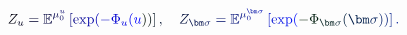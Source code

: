 \documentclass[12pt]{article}
\begin{document}
\makeatletter
\renewcommand*{\@textcolor}[3]{%
  \protect\leavevmode
  \begingroup
    \color#1{#2}#3%
  \endgroup
}
\makeatother
\begin{displaymath}
\mathcolor[RGB]{0,0,15}{Z} _ { \mathcolor[RGB]{0,0,30}{u} } \mathcolor[RGB]{0,0,45}{=} \mathbb { \mathcolor[RGB]{0,0,60}{E} } ^ { \mathcolor[RGB]{0,0,75}{\mu} _ { \mathcolor[RGB]{0,0,90}{0} } ^ { \mathcolor[RGB]{0,0,105}{u} } } \mathcolor[RGB]{0,0,120}{\left[} \mathrm { \mathcolor[RGB]{0,0,135}{e} \mathcolor[RGB]{0,0,150}{x} \mathcolor[RGB]{0,0,165}{p} } \mathcolor[RGB]{0,0,180}{(} \mathcolor[RGB]{0,0,195}{-} \mathcolor[RGB]{0,0,210}{\Phi} _ { \mathcolor[RGB]{0,0,225}{u} } \mathcolor[RGB]{0,0,240}{(} \mathcolor[RGB]{0,0,255}{u} \mathcolor[RGB]{0,15,0}{)} \mathcolor[RGB]{0,15,15}{)} \mathcolor[RGB]{0,15,30}{\right]} \mathcolor[RGB]{0,15,45}{,} \mathcolor[RGB]{0,15,60}{\quad
Z} _ { \mathcolor[RGB]{0,15,75}{\bm} { \mathcolor[RGB]{0,15,90}{\sigma} } } \mathcolor[RGB]{0,15,105}{=} \mathbb { \mathcolor[RGB]{0,15,120}{E} } ^ { \mathcolor[RGB]{0,15,135}{\mu} _ { \mathcolor[RGB]{0,15,150}{0} } ^ { \mathcolor[RGB]{0,15,165}{\bm} { \mathcolor[RGB]{0,15,180}{\sigma} } } } \mathcolor[RGB]{0,15,195}{\left[} \mathrm { \mathcolor[RGB]{0,15,210}{e} \mathcolor[RGB]{0,15,225}{x} \mathcolor[RGB]{0,15,240}{p} } \mathcolor[RGB]{0,15,255}{(} \mathcolor[RGB]{0,30,0}{-} \mathcolor[RGB]{0,30,15}{\Phi} _ { \mathcolor[RGB]{0,30,30}{\bm} { \mathcolor[RGB]{0,30,45}{\sigma} } } \mathcolor[RGB]{0,30,60}{(} \mathcolor[RGB]{0,30,75}{\bm} { \mathcolor[RGB]{0,30,90}{\sigma} } \mathcolor[RGB]{0,30,105}{)} \mathcolor[RGB]{0,30,120}{)} \mathcolor[RGB]{0,30,135}{\right]} \mathcolor[RGB]{0,30,150}{.}
\end{displaymath}
\end{document}
